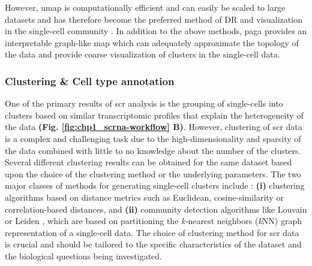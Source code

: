 However, \gls{umap} is computationally efficient and can easily be scaled to large datasets and has therefore become the preferred method of DR and visualization in the single-cell community \textbf{\cite{kobak_initialization_2021,becht_dimensionality_2018}}. In addition to the above methods, \gls{paga} \textbf{\cite{wolf_paga_2019}} provides an interpretable graph-like map which can adequately approximate the topology of the data and provide coarse visualization of clusters in the single-cell data.

\subsubsection{Clustering \& Cell type annotation}
One of the primary results of \gls{scr} analysis is the grouping of single-cells into clusters based on similar transcriptomic profiles that explain the heterogeneity of the data \textbf{(Fig. \ref{fig:chp1_scrna-workflow} B)}. However, clustering of \gls{scr} data is a complex and challenging task due to the high-dimensionality and sparsity of the data combined with little to no knowledge about the number of the clusters. Several different clustering results can be obtained for the same dataset based upon the choice of the clustering method or the underlying parameters. %
The two major classes of methods for generating single-cell clusters include : \textbf{(i)} clustering algorithms based on distance metrics such as Euclidean, cosine-similarity or correlation-based distances, and \textbf{(ii)} community detection algorithms like Louvain \textbf{\cite{blondel_fast_2008}} or Leiden \textbf{\cite{traag_louvain_2019}}, which are based on partitioning the \textit{k-}nearest neighbors (\textit{k}NN) graph representation of a single-cell data. The choice of clustering method for \gls{scr} data is crucial and should be tailored to the specific characteristics of the dataset and the biological questions being investigated.\\

